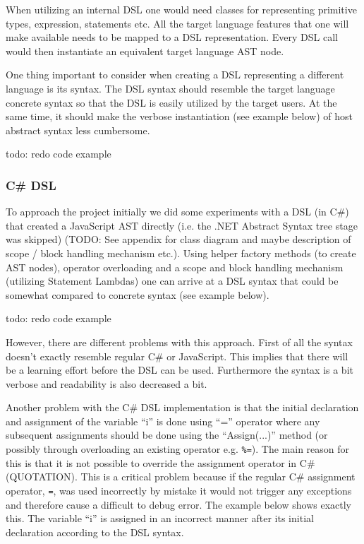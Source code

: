 			When utilizing an internal DSL one would need classes for representing primitive types, expression, statements etc. All the target language features that one will make available needs to be mapped to a DSL representation. Every DSL call would then instantiate an equivalent target language AST node.

			One thing important to consider when creating a DSL representing a different language is its syntax. The DSL syntax should resemble the target language concrete syntax so that the DSL is easily utilized by the target users. At the same time, it should make the verbose instantiation (see example below) of host abstract syntax less cumbersome.

			todo: redo code example


		\subsubsection{C\# DSL} %
		\label{sub:cs_dsl}

			To approach the project initially we did some experiments with a DSL (in C\#) that created a JavaScript AST directly (i.e. the .NET Abstract Syntax tree stage was skipped) (TODO: See appendix for class diagram and maybe description of scope / block handling mechanism etc.). Using helper factory methods (to create AST nodes), operator overloading and a scope and block handling mechanism (utilizing Statement Lambdas) one can arrive at a DSL syntax that could be somewhat compared to concrete syntax (see example below).

			todo: redo code example

			However, there are different problems with this approach. First of all the syntax doesn't exactly resemble regular C\# or JavaScript. This implies that there will be a learning effort before the DSL can be used. Furthermore the syntax is a bit verbose and readability is also decreased a bit.

			Another problem with the C\# DSL implementation is that the initial declaration and assignment of the variable ``i'' is done using ``='' operator where any subsequent assignments should be done using the ``Assign(...)'' method (or possibly through overloading an existing operator e.g. \texttt{\%=}). The main reason for this is that it is not possible to override the assignment operator in C\# (QUOTATION). This is a critical problem because if the regular C\# assignment operator, \texttt{=}, was used incorrectly by mistake it would not trigger any exceptions and therefore cause a difficult to debug error.  The example below shows exactly this. The variable ``i'' is assigned in an incorrect manner after its initial declaration according to the DSL syntax.


